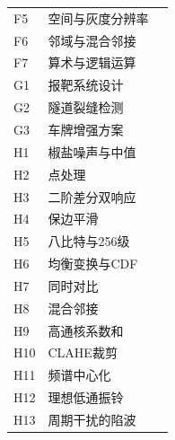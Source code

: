 \begin{longtable}{p{13mm}p{119mm}p{17mm}}
F5 & 空间与灰度分辨率 & \pageref{original:F5}\\
F6 & 邻域与混合邻接 & \pageref{original:F6}\\
F7 & 算术与逻辑运算 & \pageref{original:F7}\\
G1 & 报靶系统设计 & \pageref{original:G1}\\
G2 & 隧道裂缝检测 & \pageref{original:G2}\\
G3 & 车牌增强方案 & \pageref{original:G3}\\
H1 & 椒盐噪声与中值 & \pageref{original:H1}\\
H2 & 点处理 & \pageref{original:H2}\\
H3 & 二阶差分双响应 & \pageref{original:H3}\\
H4 & 保边平滑 & \pageref{original:H4}\\
H5 & 八比特与256级 & \pageref{original:H5}\\
H6 & 均衡变换与CDF & \pageref{original:H6}\\
H7 & 同时对比 & \pageref{original:H7}\\
H8 & 混合邻接 & \pageref{original:H8}\\
H9 & 高通核系数和 & \pageref{original:H9}\\
H10 & CLAHE裁剪 & \pageref{original:H10}\\
H11 & 频谱中心化 & \pageref{original:H11}\\
H12 & 理想低通振铃 & \pageref{original:H12}\\
H13 & 周期干扰的陷波 & \pageref{original:H13}\\
\bottomrule
\end{longtable}
